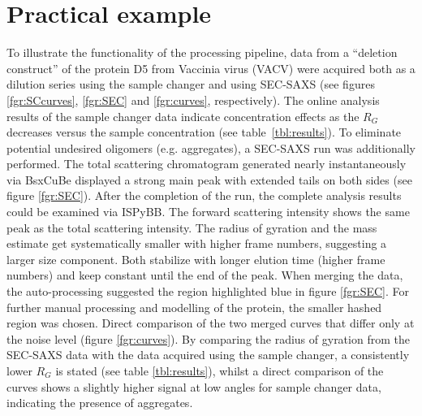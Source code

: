 \documentclass[preprint,pdf]{iucr}              %
\begin{document}
\section{Practical example}
To illustrate the functionality of the processing pipeline, data from
a ``deletion construct'' of the protein D5 from  Vaccinia virus (VACV)
were acquired both as a dilution series using the sample changer and
using SEC-SAXS (see figures \ref{fgr:SCcurves}, \ref{fgr:SEC} and
\ref{fgr:curves}, respectively).
The online analysis results of the sample changer data indicate concentration effects
as the $R_G$ decreases versus the  sample concentration (see
table~\ref{tbl:results}).
To eliminate potential undesired oligomers (e.g. aggregates), a SEC-SAXS run
was additionally performed.
The total scattering chromatogram generated nearly instantaneously via
BsxCuBe displayed a strong main peak with extended tails on both sides (see
figure \ref{fgr:SEC}).
After the completion of the run, the complete analysis results could be
examined via ISPyBB.
The forward scattering intensity shows the same peak as the total scattering intensity.
The radius of gyration and the mass estimate get systematically
smaller with higher frame numbers, suggesting a larger size component.
Both stabilize with longer elution time (higher frame numbers) and keep 
constant until the end of the peak.
When merging the data, the auto-processing suggested the region highlighted
blue in figure \ref{fgr:SEC}.
For further manual processing and modelling of the protein, the smaller
hashed region was chosen.
Direct comparison of the two merged curves that differ only at the noise
level (figure \ref{fgr:curves}).
By comparing the radius of gyration from the SEC-SAXS data with the data
acquired using the sample changer, a consistently lower $R_G$ is stated (see
table \ref{tbl:results}), whilst a direct comparison of the curves shows a
slightly higher signal at low angles for sample changer data, indicating
the presence of aggregates.

\end{document}
